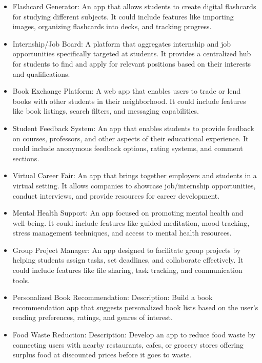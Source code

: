 \begin{itemize}
\item Flashcard Generator: An app that allows students to create digital flashcards for studying different subjects. It could include features like importing images, organizing flashcards into decks, and tracking progress.

\item Internship/Job Board: A platform that aggregates internship and job opportunities specifically targeted at students. It provides a centralized hub for students to find and apply for relevant positions based on their interests and qualifications.

\item Book Exchange Platform: A web app that enables users to trade or lend books with other students in their neighborhood. It could include features like book listings, search filters, and messaging capabilities.

\item Student Feedback System: An app that enables students to provide feedback on courses, professors, and other aspects of their educational experience. It could include anonymous feedback options, rating systems, and comment sections.

\item Virtual Career Fair: An app that brings together employers and students in a virtual setting. It allows companies to showcase job/internship opportunities, conduct interviews, and provide resources for career development.

\item Mental Health Support: An app focused on promoting mental health and well-being. It could include features like guided meditation, mood tracking, stress management techniques, and access to mental health resources.

\item Group Project Manager: An app designed to facilitate group projects by helping students assign tasks, set deadlines, and collaborate effectively. It could include features like file sharing, task tracking, and communication tools.

\item Personalized Book Recommendation: Description: Build a book recommendation app that suggests personalized book lists based on the user's reading preferences, ratings, and genres of interest.

\item Food Waste Reduction: Description: Develop an app to reduce food waste by connecting users with nearby restaurants, cafes, or grocery stores offering surplus food at discounted prices before it goes to waste.


\end{itemize}
